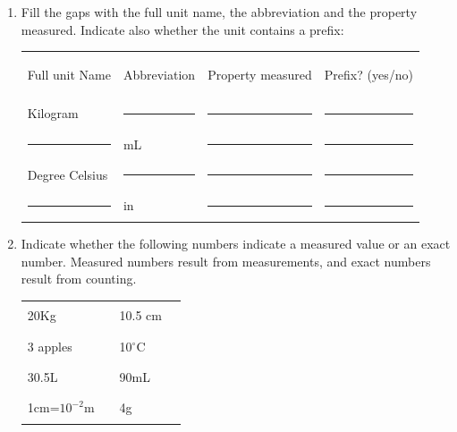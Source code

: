 \documentclass[main.tex]{subfiles}
\begin{document}
\begin{enumerate}
\item Fill the gaps with the full unit name, the abbreviation and the property measured. Indicate also whether the unit contains a prefix:
\vspace{1cm}
\begin{center}
 \begin{tabular}{ p{3cm} p{3cm} p{3cm}p{3cm}   }
   \begin{bf}Full unit Name\end{bf} & \begin{bf}Abbreviation\end{bf} &\begin{bf}Property measured\end{bf} &\begin{bf}Prefix? (yes/no)\end{bf} \\[0.1cm]     
  Kilogram 				&\rule{3cm}{0.4pt}&\rule{3cm}{0.4pt}&\rule{3cm}{0.4pt}  \\[0.1cm]      
    \rule{3cm}{0.4pt}&mL& \rule{3cm}{0.4pt}&\rule{3cm}{0.4pt}       \\[0.1cm]
     Degree Celsius 				&\rule{3cm}{0.4pt}&\rule{3cm}{0.4pt}&\rule{3cm}{0.4pt}  \\[0.1cm]      
    \rule{3cm}{0.4pt}&in& \rule{3cm}{0.4pt}&\rule{3cm}{0.4pt}       \\[0.1cm]
 \end{tabular}
 \end{center}
\vspace{.5cm}





\item Indicate whether the following numbers indicate a measured value or an exact number. Measured numbers result from measurements, and  exact numbers result from counting.\\
\vspace{1cm}
 \begin{tabular}{ p{3cm} p{3cm} p{3cm}p{3cm}   }
  20Kg 				&\rule{3cm}{0.4pt}&10.5 cm&\rule{3cm}{0.4pt}  \\[0.1cm]      
    3 apples 				&\rule{3cm}{0.4pt}&10$^{\circ}$C&\rule{3cm}{0.4pt}  \\[0.1cm]      
  30.5L				&\rule{3cm}{0.4pt}&90mL&\rule{3cm}{0.4pt}  \\[0.1cm]      
  1cm=$10^{-2}$m				&\rule{3cm}{0.4pt}&4g&\rule{3cm}{0.4pt}  \\[0.1cm]      


\end{tabular}
\end{enumerate}
\end{document}
